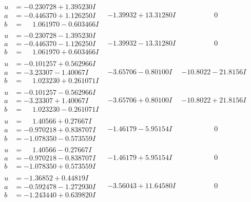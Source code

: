 \documentclass[1p]{elsarticle_modified}
\theoremstyle{definition}
\begin{document}
$$\begin{array}{c|c|c}
\begin{aligned}
u &= -0.230728 + 1.395230 I \\
a &= -0.446370 + 1.126250 I \\
b &= \phantom{-}1.061970 - 0.603466 I\end{aligned}
 & -1.39932 + 13.31280 I & \phantom{-0.000000 } 0 \\ \hline\begin{aligned}
u &= -0.230728 - 1.395230 I \\
a &= -0.446370 - 1.126250 I \\
b &= \phantom{-}1.061970 + 0.603466 I\end{aligned}
 & -1.39932 - 13.31280 I & \phantom{-0.000000 } 0 \\ \hline\begin{aligned}
u &= -0.101257 + 0.562966 I \\
a &= -3.23307 - 1.40067 I \\
b &= \phantom{-}1.023230 + 0.261071 I\end{aligned}
 & -3.65706 - 0.80100 I & -10.8022 - 21.8156 I \\ \hline\begin{aligned}
u &= -0.101257 - 0.562966 I \\
a &= -3.23307 + 1.40067 I \\
b &= \phantom{-}1.023230 - 0.261071 I\end{aligned}
 & -3.65706 + 0.80100 I & -10.8022 + 21.8156 I \\ \hline\begin{aligned}
u &= \phantom{-}1.40566 + 0.27667 I \\
a &= -0.970218 + 0.838707 I \\
b &= -1.078350 - 0.573559 I\end{aligned}
 & -1.46179 - 5.95154 I & \phantom{-0.000000 } 0 \\ \hline\begin{aligned}
u &= \phantom{-}1.40566 - 0.27667 I \\
a &= -0.970218 - 0.838707 I \\
b &= -1.078350 + 0.573559 I\end{aligned}
 & -1.46179 + 5.95154 I & \phantom{-0.000000 } 0 \\ \hline\begin{aligned}
u &= -1.36852 + 0.44819 I \\
a &= -0.592478 - 1.272930 I \\
b &= -1.243440 + 0.639820 I\end{aligned}
 & -3.56043 + 11.64580 I & \phantom{-0.000000 } 0\\

\end{array}$$
\end{document}
